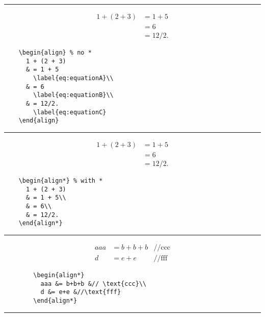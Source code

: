 \documentclass[a4paper,10pt,landscape]{article}
\newcommand{\hSep}{{\color{colorSep}\hrule}}
\theoremstyle{definition}
\theoremstyle{remark}
\begin{document}
\begin{multicols}{3}
\hSep
\begin{multicols}{2}
	\begin{align} %
	  1 + (2 + 3)
	  & = 1 + 5
	  	  \label{eq:equationA}\\
	  & = 6
	  	  \label{eq:equationB}\\
	  & = 12/2.
	  	  \label{eq:equationC}
	\end{align}
\columnbreak
	\begin{verbatim}
	\begin{align} % no *
	  1 + (2 + 3)
	  & = 1 + 5
	    \label{eq:equationA}\\
	  & = 6
	    \label{eq:equationB}\\
	  & = 12/2.
	    \label{eq:equationC}
	\end{align}
	\end{verbatim}
\end{multicols}
\hSep
\begin{multicols}{2}
	\begin{align*} %
	  1 + (2 + 3)
	  & = 1 + 5\\
	  & = 6\\
	  & = 12/2.
	\end{align*}
\columnbreak
	\begin{verbatim}
	\begin{align*} % with *
	  1 + (2 + 3)
	  & = 1 + 5\\
	  & = 6\\
	  & = 12/2.
	\end{align*}
	\end{verbatim}
\end{multicols}
\hSep
\begin{multicols}{2}
		\begin{align*}
		  aaa &= b+b+b &// \text{ccc}\\
		  d &= e+e &//\text{fff}
		\end{align*}
\columnbreak
	\begin{verbatim}
		\begin{align*}
		  aaa &= b+b+b &// \text{ccc}\\
		  d &= e+e &//\text{fff}
		\end{align*}
	\end{verbatim}
\end{multicols}
\hSep





\end{multicols}
\end{document}
